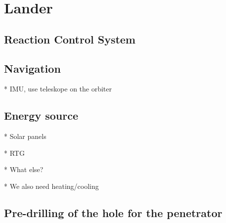 \chapter{Lander}





\section{Reaction Control System}

\section{Navigation}

* IMU, use teleskope on the orbiter

\section{Energy source}

* Solar panels

* RTG

* What else?

* We also need heating/cooling

\section{Pre-drilling of the hole for the penetrator}
